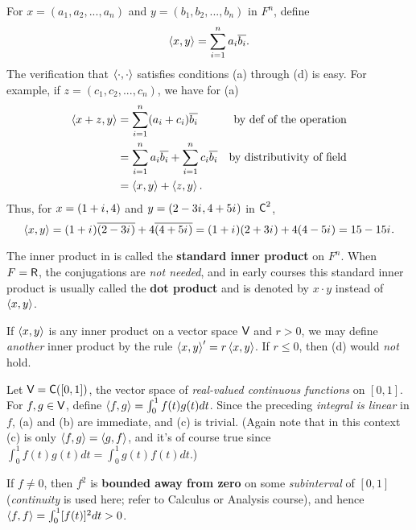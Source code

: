 \begin{example} \label{example 6.1.1}
For \(x = (a_1, a_2, ..., a_n)\) and \(y = (b_1, b_2, ..., b_n)\) in \(F^n\), define
\[
    \left< x, y \right> = \sum_{i = 1}^n a_i \overline{b_i}.
\]
The verification that \(\left< \cdot, \cdot \right>\) satisfies conditions (a) through (d) is easy.
For example, if \(z = (c_1, c_2, ..., c_n)\), we have for (a)
\begin{align*}
    \left< x + z, y \right> & = \sum_{i = 1}^n (a_i + c_i) \overline{b_i} & \text{by def of the operation} \\
    & = \sum_{i = 1}^n a_i \overline{b_i} + \sum_{i = 1}^n c_i \overline{b_i} & \text{by distributivity of field} \\
    & = \left< x, y \right> + \left< z, y \right>.
\end{align*}
Thus, for \(x = (1 + {i\mkern1mu}, 4)\) and \(y = (2 - 3{i\mkern1mu}, 4 + 5{i\mkern1mu})\) in \(\textsf{C}^2\),
\[
    \left< x, y \right> = (1 + {i\mkern1mu})\overline{(2 - 3{i\mkern1mu})} + 4\overline{(4 + 5{i\mkern1mu})} = (1 + {i\mkern1mu})(2 + 3{i\mkern1mu}) + 4(4 - 5{i\mkern1mu}) = 15 - 15{i\mkern1mu}.
\]
\end{example}

\begin{remark} \label{remark 6.1.2}
The inner product in  is called the \textbf{standard inner product} on \(F^n\).
When \(F = \textsf{R}\), the conjugations are \emph{not needed}, and in early courses this standard inner product is usually called the \textbf{dot product} and is denoted by \(x \cdot y\) instead of \(\left< x,y \right>\).
\end{remark}

\begin{example} \label{example 6.1.2}
If \(\left< x, y \right>\) is any inner product on a vector space \(\textsf{V}\) and \(r > 0\), we may define \emph{another} inner product by the rule \(\left< x, y \right>' = r \left< x, y \right>\).
If \(r \le 0\), then (d) would \emph{not} hold.
\end{example}

\begin{example} \label{example 6.1.3}
Let \(\textsf{V} = \textsf{C}([0, 1])\), the vector space of \emph{real-valued continuous functions} on \([0, 1]\).
For \(f, g \in \textsf{V}\), define \(\left< f, g \right> = \int_0^1 f(t)g(t) dt\).
Since the preceding \emph{integral is linear} in \(f\), (a) and (b) are immediate, and (c) is trivial.
(Again note that in this context (c) is only \(\left< f, g \right> = \left< g, f \right>\), and it's of course true since \(\int_0^1 f(t)g(t) dt = \int_0^1 g(t)f(t) dt\).)

If \(f \ne 0\), then \(f^2\) is \textbf{bounded away from zero} on some \emph{subinterval} of \([0, 1]\) (\emph{continuity} is used here; refer to Calculus or Analysis course), and hence \(\left< f, f \right> = \int_0^1 [f(t)]^2 dt > 0\).
\end{example}

